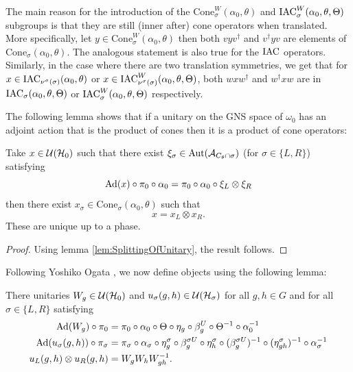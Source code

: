 \documentclass[11pt,a4paper,twoside]{article}
\numberwithin{equation}{section}
\begin{document}
	\begin{remark}
		The main reason for the introduction of the $\textrm{Cone}_\sigma^W(\alpha_0,\theta)$ and $\textrm{IAC}^W_\sigma(\alpha_0,\theta,\Theta)$ subgroups is that they are still (inner after) cone operators when translated. More specifically, let $y\in\textrm{Cone}_\sigma^W(\alpha_0,\theta)$ then both $vyv^\dagger$ and $v^\dagger y v$ are elements of $\textrm{Cone}_\sigma(\alpha_0,\theta)$. The analogous statement is also true for the $\textrm{IAC}$ operators. Similarly, in the case where there are two translation symmetries, we get that for $x\in\textrm{IAC}_{\nu^\sigma(\sigma)}(\alpha_0,\theta)$ or $x\in\textrm{IAC}_{\nu^\sigma(\sigma)}^W(\alpha_0,\theta,\Theta)$, both $wx w^\dagger$ and $w^\dagger x w$ are in $\textrm{IAC}_{\sigma}(\alpha_0,\theta,\Theta)$ or $\textrm{IAC}_{\sigma}^W(\alpha_0,\theta,\Theta)$ respectively.
	\end{remark}
	The following lemma shows that if a unitary on the GNS space of $\omega_0$ has an adjoint action that is the product of cones then it is a product of cone operators:
	\begin{lemma}\label{lem:UsingIrreducibilityAndWignerTheorem}
		Take $x\in\mathcal U(\mathcal H_0)$ such that there exist $\xi_\sigma\in\Aut{\AA_{C_\theta\cap\sigma}}$ (for $\sigma\in\{L,R\}$) satisfying
		\begin{equation}
			\Ad{x}\circ\pi_0\circ\alpha_0=\pi_0\circ\alpha_0\circ\xi_L\otimes\xi_R
		\end{equation}
		then there exist $x_\sigma\in\textrm{Cone}_\sigma(\alpha_0,\theta)$ such that
		\begin{equation}
			x=x_L\otimes x_R.
		\end{equation}
		These are unique up to a phase.
	\end{lemma}
	\begin{proof}
		Using lemma \ref{lem:SplittingOfUnitary}, the result follows.
	\end{proof}
	Following Yoshiko Ogata \cite{ogata2021h3gmathbb}, we now define objects using the following lemma:
	\begin{lemma}\label{lem:Definition_W_And_u}
		There unitaries $W_g\in\mathcal U(\mathcal H_0)$ and $u_{\sigma}(g,h)\in\mathcal U(\mathcal H_{\sigma})$ for all $g,h\in G$ and for all $\sigma\in\{L,R\}$ satisfying
		\begin{align}
			\Ad{W_g}\circ\pi_0&=\pi_0\circ\alpha_0\circ\Theta\circ\eta_g\circ\beta_g^U\circ\Theta^{-1}\circ\alpha_0^{-1}\\
			\Ad{u_\sigma(g,h)}\circ\pi_\sigma&=\pi_\sigma\circ\alpha_\sigma\circ\eta_g^\sigma\circ\beta_g^{\sigma U}\circ\eta_h^{\sigma}\circ(\beta_g^{\sigma U})^{-1}\circ(\eta^\sigma_{gh})^{-1}\circ\alpha_\sigma^{-1}\\
			u_L(g,h)\otimes u_R(g,h)&=W_gW_hW_{gh}^{-1}.
		\end{align}
	\end{lemma}
\end{document}
